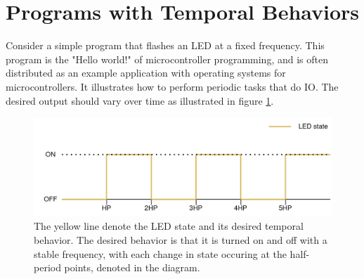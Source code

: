 
\section{Programs with Temporal Behaviors}

Consider a simple program
that flashes an LED at a fixed frequency. This program is the "Hello world!" of microcontroller programming, and is often distributed
as an example application with operating systems for microcontrollers. It illustrates how to perform
periodic tasks that do IO. The desired output should vary over time as illustrated in figure \ref{graphics:correct-frequency}.

\begin{figure}
    \centering
    \includegraphics[scale=0.2]{graphics/correct-frequency.png}
    \caption{The yellow line denote the LED state and its desired temporal behavior. The desired behavior
    is that it is turned on and off with a stable frequency, with each change in state occuring at the
    half-period points, denoted  in the diagram.}
    \label{graphics:correct-frequency}
\end{figure}

